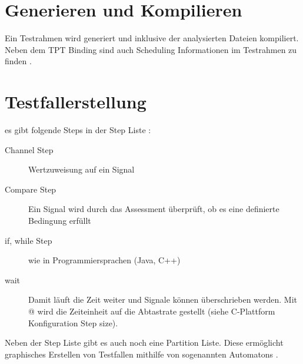 \section*{Generieren und Kompilieren}
Ein Testrahmen wird generiert und inklusive der analysierten Dateien kompiliert.
Neben dem TPT Binding sind auch Scheduling Informationen im Testrahmen zu finden \parencite[S. 868 ff.]{userguide}.

\section*{Testfallerstellung}
es gibt folgende Steps in der Step Liste \parencite[S. 437 ff.]{userguide}:
\begin{description}
\item[Channel Step] Wertzuweisung auf ein Signal
\item[Compare Step] Ein Signal wird durch das Assessment überprüft, ob es eine definierte Bedingung erfüllt
\item[if, while Step] wie in Programmiersprachen (Java, C++)
\item[wait] Damit läuft die Zeit weiter und Signale können überschrieben werden. Mit @ wird die Zeiteinheit auf die Abtastrate gestellt (siehe C-Plattform Konfiguration Step size).
\end{description}
Neben der Step Liste gibt es auch noch eine Partition Liste. Diese ermöglicht graphisches Erstellen von Testfallen mithilfe von sogenannten Automatons \parencite[S. 437 ff.]{userguide}.
